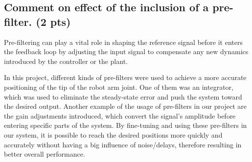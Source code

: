 \subsection{Comment on effect of the inclusion of a pre-filter. (2 pts)}
\vspace{10pt}


Pre-filtering can play a vital role in shaping the reference signal before it enters the feedback loop by adjusting the input signal to compensate any new dynamics introduced by the controller or the plant. 

In this project, different kinds of pre-filters were used to achieve a more accurate positioning of the tip of the robot arm joint. One of them was an integrator, which was used to eliminate the steady-state error and push the system toward the desired output. Another example of the usage of pre-filters in our project are the gain adjustments introduced, which convert the signal's amplitude before entering specific parts of the system. By fine-tuning and using these pre-filters in our system, it is possible to reach the desired positions more quickly and accurately without having a big influence of noise/delays, therefore resulting in better overall performance.